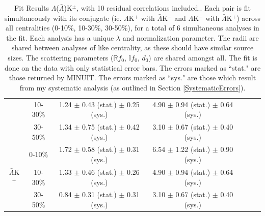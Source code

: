 \documentclass[../AnalysisNoteJBuxton.tex]{subfiles}
\begin{document}
\begin{landscape}
\begin{table}[htbp]
{\begin{tabular}{|c|c|c|c|c|c|c|}
   & 10-30\% & 1.24 $\pm$ 0.43 (stat.) $\pm$ 0.25 (sys.)  %
             & 4.90 $\pm$ 0.94 (stat.) $\pm$ 0.64 (sys.)  %
             & & & \\
             
   & 30-50\% & 1.34 $\pm$ 0.75 (stat.) $\pm$ 0.42 (sys.)  %
             & 3.10 $\pm$ 0.67 (stat.) $\pm$ 0.40 (sys.)  %
             & & & \\
  \cline{1-4}  
  \multirow{3}{*}{$\bar{\Lambda}$K$^{+}$}  
   &  0-10\% & 1.72 $\pm$ 0.58 (stat.) $\pm$ 0.31 (sys.)  %
             & 6.54 $\pm$ 1.22 (stat.) $\pm$ 0.90 (sys.)  %
             & & & \\
             
   & 10-30\% & 1.33 $\pm$ 0.46 (stat.) $\pm$ 0.26 (sys.)  %
             & 4.90 $\pm$ 0.94 (stat.) $\pm$ 0.64 (sys.)  %
             & & & \\
             
   & 30-50\% & 0.84 $\pm$ 0.31 (stat.) $\pm$ 0.31 (sys.)  %
             & 3.10 $\pm$ 0.67 (stat.) $\pm$ 0.40 (sys.)  %
             & & & \\
  \hline
 \end{tabular}}
 \caption{Fit Results $\Lambda$($\bar{\Lambda}$)K$^{\pm}$, with 10 residual correlations included..
 Each pair is fit simultaneously with its conjugate (ie. $\Lambda$K$^{+}$ with $\bar{\Lambda}$K$^{-}$ and $\Lambda$K$^{-}$ with $\bar{\Lambda}$K$^{+}$) across all centralities (0-10\%, 10-30\%, 30-50\%), for a total of 6 simultaneous analyses in the fit.
 Each analysis has a unique $\lambda$ and normalization parameter.
 The radii are shared between analyses of like centrality, as these should have similar source sizes.
 The scattering parameters ($\mathbb{R}f_{0}$, $\mathbb{I}f_{0}$, $d_{0}$) are shared amongst all.
 The fit is done on the data with only statistical error bars.
 The errors marked as ``stat." are those returned by MINUIT.
 The errors marked as ``sys." are those which result from my systematic analysis (as outlined in Section \ref{SystematicErrors}).}
 \label{tab:FitResultsLamKch_10Res}
\end{table}




\end{landscape}
\end{document}
